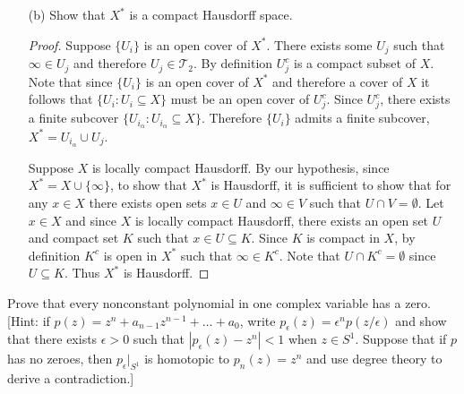 \documentclass{homework651}
\begin{document}
\begin{problems}
\begin{enumerate}
\begin{proof}
        
    \end{proof}
    \item[(b)] Show that $X^*$ is a compact Hausdorff space.  
    \begin{proof} Suppose $\{U_i\}$ is an open cover of $X^*$. There exists some $U_j$ such that 
        $\infty \in U_j$ and therefore $U_j \in \mathcal{T}_2$. By definition $U_j^c$ is a compact subset of $X$. Note that since $\{U_i\}$ is an open cover of $X^*$ and therefore a cover of $X$ it follows that $\{U_i: U_i \subseteq X\}$ must be an open cover of $U_j^c$. Since $U_j^c$, there exists a finite subcover $\{U_{i_\alpha}: U_{i_\alpha} \subseteq X\}$. Therefore $\{U_i\}$ admits a finite subcover, $X^* = U_{i_\alpha} \cup U_j$. 

        
        Suppose $X$ is locally compact Hausdorff. By our hypothesis, since $X^* = X \cup \{\infty\}$, to show that $X^*$ is Hausdorff, it is sufficient to show that for any $x \in X$ there exists open sets $x \in U$ and $\infty \in V$ such that $U \cap V = \emptyset$. Let $x \in X$
        and since $X$ is locally compact Hausdorff, there exists an open set $U$ and compact set $K$
        such that $x \in U \subseteq K$. Since $K$ is compact in $X$, by definition $K^c$ is open in $X^*$ such that $\infty \in K^c$. Note that $U \cap K^c = \emptyset$ since $U \subseteq K$. Thus $X^*$ is Hausdorff. 
        
    \end{proof}
\end{enumerate}



\problem Prove that every nonconstant polynomial in one complex variable has a zero. 
[Hint: if $p(z) = z^n + a_{n - 1}z^{n - 1}+\dots+a_0$, write $p_{\epsilon}(z) = \epsilon^np(z/\epsilon)$ and show that there exists 
$\epsilon > 0$ such that $|p_\epsilon(z) - z^n|<1$ when $z \in S^1$. Suppose that if $p$ has no zeroes, then $p_\epsilon|_{S^1}$ is homotopic 
to $p_n(z) = z^n$ and use degree theory to derive a contradiction.]





\end{problems}
\end{document}
